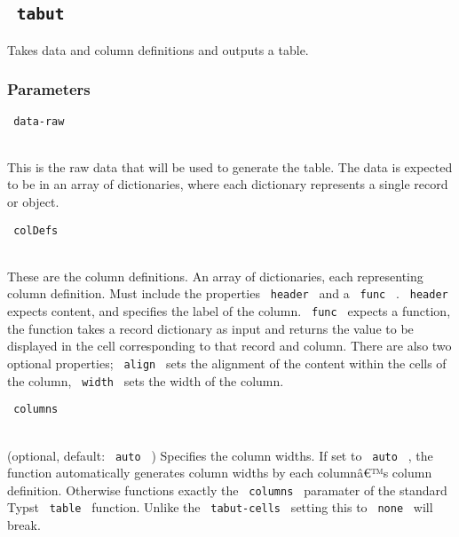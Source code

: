 \pandocbounded{}

\subsection[\texttt{\ tabut\ } ]{\texorpdfstring{\texttt{\ tabut\ }
\protect\hypertarget{tabut}{}{ }}{ tabut   }}\label{tabut-1}

Takes data and column definitions and outputs a table.

\begin{Shaded}
\begin{Highlighting}[]
\end{Highlighting}
\end{Shaded}

\subsubsection{Parameters}\label{parameters}

\texttt{\ data-raw\ }\strut \\
This is the raw data that will be used to generate the table. The data
is expected to be in an array of dictionaries, where each dictionary
represents a single record or object.

\texttt{\ colDefs\ }\strut \\
These are the column definitions. An array of dictionaries, each
representing column definition. Must include the properties
\texttt{\ header\ } and a \texttt{\ func\ } . \texttt{\ header\ }
expects content, and specifies the label of the column.
\texttt{\ func\ } expects a function, the function takes a record
dictionary as input and returns the value to be displayed in the cell
corresponding to that record and column. There are also two optional
properties; \texttt{\ align\ } sets the alignment of the content within
the cells of the column, \texttt{\ width\ } sets the width of the
column.

\texttt{\ columns\ }\strut \\
(optional, default: \texttt{\ auto\ } ) Specifies the column widths. If
set to \texttt{\ auto\ } , the function automatically generates column
widths by each columnâ€™s column definition. Otherwise functions exactly
the \texttt{\ columns\ } paramater of the standard Typst
\texttt{\ table\ } function. Unlike the \texttt{\ tabut-cells\ } setting
this to \texttt{\ none\ } will break.

